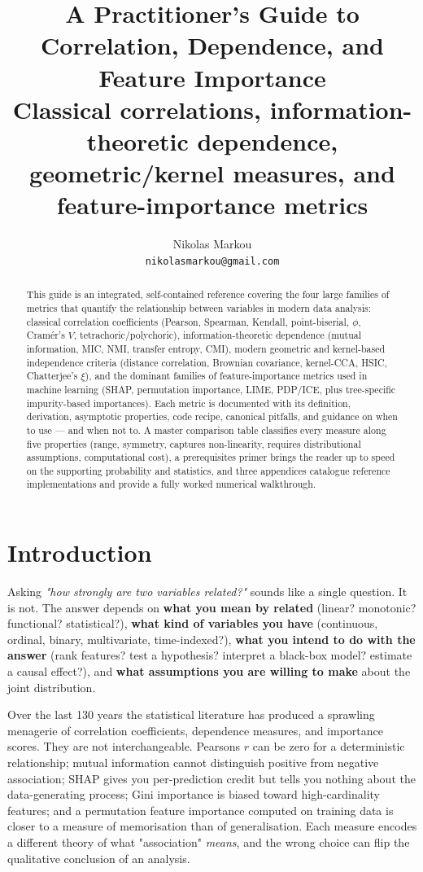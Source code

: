 \documentclass{article}
\title{A Practitioner's Guide to Correlation, Dependence, and Feature Importance\\
\large{Classical correlations, information-theoretic dependence, geometric/kernel measures, and feature-importance metrics}}
\author{
  Nikolas Markou \\
  \texttt{nikolasmarkou@gmail.com}
}
\date{}
\let\oldsection\section
\renewcommand{\section}{\clearpage\oldsection}
\begin{document}
\maketitle

\begin{abstract}
This guide is an integrated, self-contained reference covering the four large families of metrics that quantify the relationship between variables in modern data analysis: classical correlation coefficients (Pearson, Spearman, Kendall, point-biserial, $\phi$, Cram\'er's $V$, tetrachoric/polychoric), information-theoretic dependence (mutual information, MIC, NMI, transfer entropy, CMI), modern geometric and kernel-based independence criteria (distance correlation, Brownian covariance, kernel-CCA, HSIC, Chatterjee's $\xi$), and the dominant families of feature-importance metrics used in machine learning (SHAP, permutation importance, LIME, PDP/ICE, plus tree-specific impurity-based importances). Each metric is documented with its definition, derivation, asymptotic properties, code recipe, canonical pitfalls, and guidance on when to use --- and when not to. A master comparison table classifies every measure along five properties (range, symmetry, captures non-linearity, requires distributional assumptions, computational cost), a prerequisites primer brings the reader up to speed on the supporting probability and statistics, and three appendices catalogue reference implementations and provide a fully worked numerical walkthrough.
\end{abstract}

\tableofcontents
\clearpage


\section{Introduction}\label{introduction}

Asking \emph{"how strongly are two variables related?"} sounds like a
single question. It is not. The answer depends on \textbf{what you mean
by related} (linear? monotonic? functional? statistical?), \textbf{what
kind of variables you have} (continuous, ordinal, binary, multivariate,
time-indexed?), \textbf{what you intend to do with the answer} (rank
features? test a hypothesis? interpret a black-box model? estimate a
causal effect?), and \textbf{what assumptions you are willing to make}
about the joint distribution.

Over the last 130 years the statistical literature has produced a
sprawling menagerie of correlation coefficients, dependence measures,
and importance scores. They are not interchangeable.
Pearson\textquotesingle s \(r\) can be zero for a deterministic
relationship; mutual information cannot distinguish positive from
negative association; SHAP gives you per-prediction credit but tells you
nothing about the data-generating process; Gini importance is biased
toward high-cardinality features; and a permutation feature importance
computed on training data is closer to a measure of memorisation than of
generalisation. Each measure encodes a different theory of what
"association" \emph{means}, and the wrong choice can flip the
qualitative conclusion of an analysis.
\end{document}
